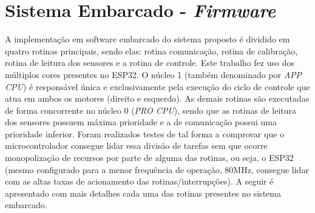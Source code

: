 \section{Sistema Embarcado - \emph{Firmware}}
\label{sec:sistema_embarcado}

A implementação em software embarcado do sistema proposto é dividido em quatro rotinas principais, sendo elas: rotina comunicação, rotina de calibração, rotina de leitura dos sensores  e a rotina de controle. 
Este trabalho fez uso dos múltiplos cores presentes no ESP32. 
O núcleo 1 (também denominado por \emph{APP CPU}) é responsável única e
exclusivamente  pela execução do ciclo de controle que atua em ambos os motores (direito e esquerdo). 
As demais rotinas são executadas de forma concorrente no núcleo 0 (\emph{PRO CPU}), sendo que as rotinas de leitura dos sensores possuem máxima prioridade e a de comunicação possui uma prioridade inferior. Foram realizados testes de tal forma a comprovar que o microcontrolador consegue lidar essa 
divisão de tarefas sem que ocorre monopolização de recursos por parte de alguma das rotinas, ou seja, o ESP32 (mesmo configurado para a menor frequência de operação, 80MHz, consegue lidar com as altas taxas de acionamento das rotinas/interrupções). A seguir é apresentado com mais detalhes cada uma das rotinas presentes no 
sistema embarcado.




